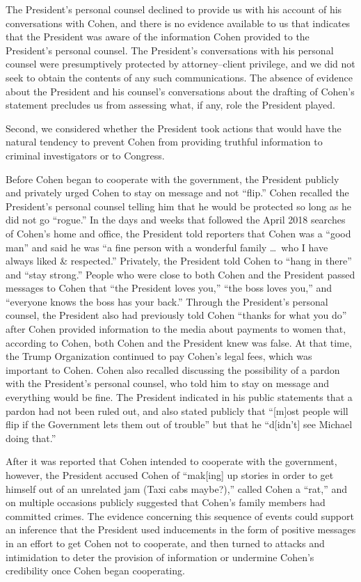 The President's personal counsel declined to provide us with his account of his conversations with Cohen, and there is no evidence available to us that indicates that the President was aware of the information Cohen provided to the President's personal counsel.
The President's conversations with his personal counsel were presumptively protected by attorney--client privilege, and we did not seek to obtain the contents of any such communications.
The absence of evidence about the President and his counsel's conversations about the drafting of Cohen's statement precludes us from assessing what, if any, role the President played.

Second, we considered whether the President took actions that would have the natural tendency to prevent Cohen from providing truthful information to criminal investigators or to Congress.

Before Cohen began to cooperate with the government, the President publicly and privately urged Cohen to stay on message and not ``flip.'' Cohen recalled the President's personal counsel telling him that he would be protected so long as he did not go ``rogue.''
In the days and weeks that followed the April 2018 searches of Cohen's home and office, the President told reporters that Cohen was a ``good man'' and said he was ``a fine person with a wonderful family \dots\ who I have always liked \& respected.''
Privately, the President told Cohen to ``hang in there'' and ``stay strong.'' People who were close to both Cohen and the President passed messages to Cohen that ``the President loves you,'' ``the boss loves you,'' and ``everyone knows the boss has your back.''
Through the President's personal counsel, the President also had previously told Cohen ``thanks for what you do'' after Cohen provided information to the media about payments to women that, according to Cohen, both Cohen and the President knew was false.
At that time, the Trump Organization continued to pay Cohen's legal fees, which was important to Cohen.
Cohen also recalled discussing the possibility of a pardon with the President's personal counsel, who told him to stay on message and everything would be fine.
The President indicated in his public statements that a pardon had not been ruled out, and also stated publicly that ``[m]ost people will flip if the Government lets them out of trouble'' but that he ``d[idn't] see Michael doing that.''

After it was reported that Cohen intended to cooperate with the government, however, the President accused Cohen of ``mak[ing] up stories in order to get himself out of an unrelated jam (Taxi cabs maybe?),'' called Cohen a ``rat,'' and on multiple occasions publicly suggested that Cohen's family members had committed crimes.
The evidence concerning this sequence of events could support an inference that the President used inducements in the form of positive messages in an effort to get Cohen not to cooperate, and then turned to attacks and intimidation to deter the provision of information or undermine Cohen's credibility once Cohen began cooperating.

